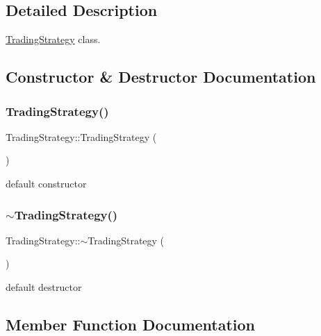 \subsection{Detailed Description}
\hyperlink{classTradingStrategy}{Trading\+Strategy} class. 

\subsection{Constructor \& Destructor Documentation}
\mbox{\label{classTradingStrategy_a26f088c714200a67a248591fc2023a20}} 
\subsubsection{\texorpdfstring{Trading\+Strategy()}{TradingStrategy()}}
{\footnotesize\ttfamily Trading\+Strategy\+::\+Trading\+Strategy (\begin{DoxyParamCaption}{ }\end{DoxyParamCaption})}

default constructor \mbox{\label{classTradingStrategy_aab4c9c86553ad820ccc52fda3412d32b}} 
\subsubsection{\texorpdfstring{$\sim$\+Trading\+Strategy()}{~TradingStrategy()}}
{\footnotesize\ttfamily Trading\+Strategy\+::$\sim$\+Trading\+Strategy (\begin{DoxyParamCaption}{ }\end{DoxyParamCaption})}

default destructor 

\subsection{Member Function Documentation}
\mbox{\label{classTradingStrategy_a4029029df708f9f0f013603b19f449ff}} 
